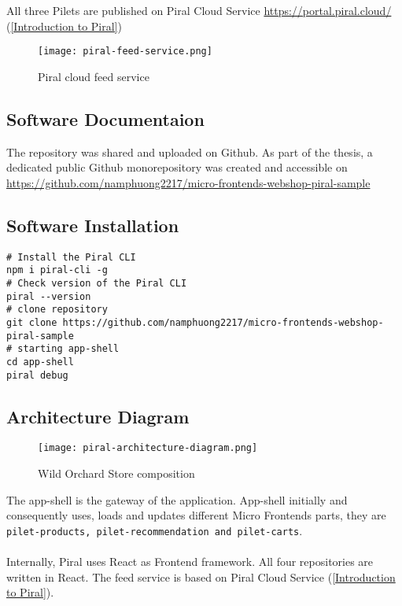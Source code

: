 \documentclass[a4paper]{book}
\begin{document}
All three Pilets are published on Piral Cloud Service \url{https://portal.piral.cloud/ } (\ref{Introduction to Piral})
\begin{figure}[h!]
  \centering
  \captionsetup{justification=centering}
  \texttt{[image: piral-feed-service.png]}
   \caption{Piral cloud feed service}
  \label{fig:9}
\end{figure}
\subsection{Software Documentaion}
The repository was shared and uploaded on Github. As part of the thesis, a dedicated public Github monorepository was created and accessible on \url{https://github.com/namphuong2217/micro-frontends-webshop-piral-sample}

\subsection{Software Installation}

\begin{lstlisting}[caption={Installation step by step (\url{https://docs.piral.io/guidelines/tutorials/02-getting-started})}]
# Install the Piral CLI
npm i piral-cli -g
# Check version of the Piral CLI
piral --version
# clone repository
git clone https://github.com/namphuong2217/micro-frontends-webshop-piral-sample
# starting app-shell
cd app-shell
piral debug 
\end{lstlisting}

\subsection{Architecture Diagram}
\clearpage
\begin{figure}[ht!]
  \centering
  \captionsetup{justification=centering}
  \texttt{[image: piral-architecture-diagram.png]}
  \caption{Wild Orchard Store composition}
  \label{fig:piral-architecture-diagram}
\end{figure}
The app-shell is the gateway of the application. App-shell initially and consequently uses, loads and updates different Micro Frontends parts, they are \verb|pilet-products, pilet-recommendation and pilet-carts|.
\\ \\
Internally, Piral uses React as Frontend framework. All four repositories are written in React. \cite{React} The feed service is based on Piral Cloud Service (\ref{Introduction to Piral}).
\end{document}
